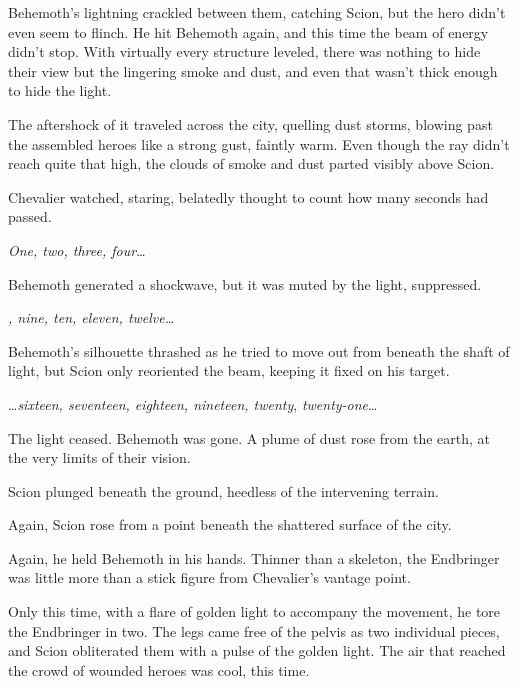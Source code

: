Behemoth's lightning crackled between them, catching Scion, but the hero didn't even seem to flinch.  He hit Behemoth again, and this time the beam of energy didn't stop.  With virtually every structure leveled, there was nothing to hide their view but the lingering smoke and dust, and even that wasn't thick enough to hide the light.



The aftershock of it traveled across the city, quelling dust storms, blowing past the assembled heroes like a strong gust, faintly warm.  Even though the ray didn't reach quite that high, the clouds of smoke and dust parted visibly above Scion.



Chevalier watched, staring, belatedly thought to count how many seconds had passed.



\emph{One, two, three, four}\ldots



Behemoth generated a shockwave, but it was muted by the light, suppressed.



\emph{\ldotseight, nine, ten, eleven, twelve\ldots}



Behemoth's silhouette thrashed as he tried to move out from beneath the shaft of light, but Scion only reoriented the beam, keeping it fixed on his target.



\ldots\emph{sixteen, seventeen, eighteen, nineteen, twenty}, \emph{twenty-one}\ldots



The light ceased.  Behemoth was gone.  A plume of dust rose from the earth, at the very limits of their vision.



Scion plunged beneath the ground, heedless of the intervening terrain.



Again, Scion rose from a point beneath the shattered surface of the city.



Again, he held Behemoth in his hands.  Thinner than a skeleton, the Endbringer was little more than a stick figure from Chevalier's vantage point.



Only this time, with a flare of golden light to accompany the movement, he tore the Endbringer in two.  The legs came free of the pelvis as two individual pieces, and Scion obliterated them with a pulse of the golden light.  The air that reached the crowd of wounded heroes was cool, this time.



